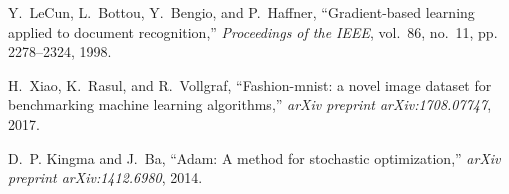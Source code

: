 \documentclass[lettersize,journal]{IEEEtran}
\begin{document}
\begin{thebibliography}{10}
Y.~LeCun, L.~Bottou, Y.~Bengio, and P.~Haffner, ``Gradient-based learning
  applied to document recognition,'' \emph{Proceedings of the IEEE}, vol.~86,
  no.~11, pp. 2278--2324, 1998.

H.~Xiao, K.~Rasul, and R.~Vollgraf, ``Fashion-mnist: a novel image dataset for
  benchmarking machine learning algorithms,'' \emph{arXiv preprint
  arXiv:1708.07747}, 2017.

D.~P. Kingma and J.~Ba, ``Adam: A method for stochastic optimization,''
  \emph{arXiv preprint arXiv:1412.6980}, 2014.

\end{thebibliography}





\newpage


\vfill
\end{document}
